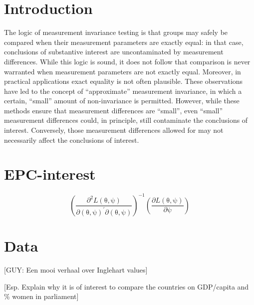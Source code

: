 \documentclass[letterpaper,12pt]{article}
\newcommand\vm[1]{%
\bm{\mathrm{#1}}}
\newcommand{\param}{\vm{\theta}}
\newcommand{\bpsi}{\vm{\psi}}
\begin{document}
\section{Introduction}

\noindent

The logic of measurement invariance testing is that groups may safely be compared when their measurement parameters are exactly equal: in that case, conclusions of substantive interest are uncontaminated by measurement differences. While this logic is sound, it does not follow that comparison is never warranted when measurement parameters are not exactly equal. Moreover, in practical applications exact equality is not often plausible. These observations have led to the concept of ``approximate'' measurement  invariance, in which a certain, ``small'' amount of non-invariance is permitted. 
However, while these methods ensure that measurement differences are ``small'', even ``small'' measurement differences could, in principle, still contaminate the conclusions of interest. Conversely, those measurement differences allowed for may not necessarily affect the conclusions of interest. 


\citep{muthen2012bayesian}
\citep{schoot2013facing}

\citep{muthen2014alignment}


\section{EPC-interest}

\begin{equation}
	\left( \frac{\partial^2 L(\param, \bpsi)}{\partial (\param, \bpsi)^\prime \partial (\param, \bpsi)} \right)^{-1}
		\left( \frac{\partial L(\param, \bpsi)}{\partial \bpsi} \right)
\end{equation}



\section{Data}

[GUY: Een mooi verhaal over Inglehart values]

[Esp. Explain why it is of interest to compare the countries on GDP/capita and \% women in parliament]
\end{document}
